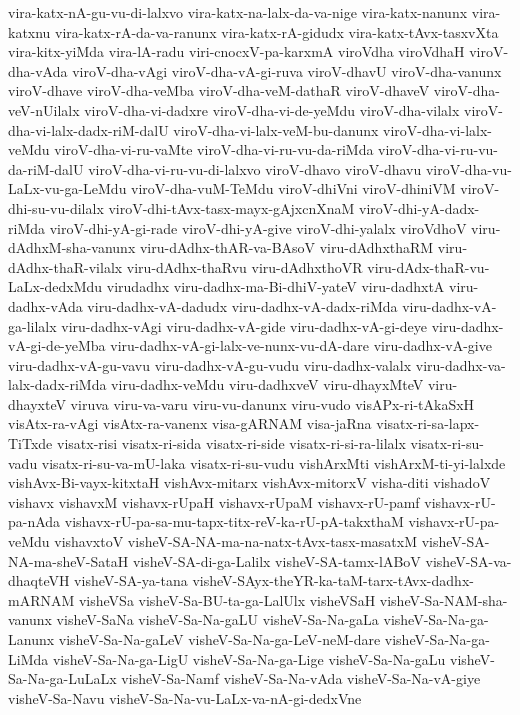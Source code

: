 {vira-katx-nA-gu-vu-di-lalxvo
vira-katx-na-lalx-da-va-nige
vira-katx-nanunx
vira-katxnu
vira-katx-rA-da-va-ranunx
vira-katx-rA-gidudx
vira-katx-tAvx-tasxvXta
vira-kitx-yiMda
vira-lA-radu
viri-cnocxV-pa-karxmA
viroVdha
viroVdhaH
viroV-dha-vAda
viroV-dha-vAgi
viroV-dha-vA-gi-ruva
viroV-dhavU
viroV-dha-vanunx
viroV-dhave
viroV-dha-veMba
viroV-dha-veM-dathaR
viroV-dhaveV
viroV-dha-veV-nUilalx
viroV-dha-vi-dadxre
viroV-dha-vi-de-yeMdu
viroV-dha-vilalx
viroV-dha-vi-lalx-dadx-riM-dalU
viroV-dha-vi-lalx-veM-bu-danunx
viroV-dha-vi-lalx-veMdu
viroV-dha-vi-ru-vaMte
viroV-dha-vi-ru-vu-da-riMda
viroV-dha-vi-ru-vu-da-riM-dalU
viroV-dha-vi-ru-vu-di-lalxvo
viroV-dhavo
viroV-dhavu
viroV-dha-vu-LaLx-vu-ga-LeMdu
viroV-dha-vuM-TeMdu
viroV-dhiVni
viroV-dhiniVM
viroV-dhi-su-vu-dilalx
viroV-dhi-tAvx-tasx-mayx-gAjxcnXnaM
viroV-dhi-yA-dadx-riMda
viroV-dhi-yA-gi-rade
viroV-dhi-yA-give
viroV-dhi-yalalx
viroVdhoV
viru-dAdhxM-sha-vanunx
viru-dAdhx-thAR-va-BAsoV
viru-dAdhxthaRM
viru-dAdhx-thaR-vilalx
viru-dAdhx-thaRvu
viru-dAdhxthoVR
viru-dAdx-thaR-vu-LaLx-dedxMdu
virudadhx
viru-dadhx-ma-Bi-dhiV-yateV
viru-dadhxtA
viru-dadhx-vAda
viru-dadhx-vA-dadudx
viru-dadhx-vA-dadx-riMda
viru-dadhx-vA-ga-lilalx
viru-dadhx-vAgi
viru-dadhx-vA-gide
viru-dadhx-vA-gi-deye
viru-dadhx-vA-gi-de-yeMba
viru-dadhx-vA-gi-lalx-ve-nunx-vu-dA-dare
viru-dadhx-vA-give
viru-dadhx-vA-gu-vavu
viru-dadhx-vA-gu-vudu
viru-dadhx-valalx
viru-dadhx-va-lalx-dadx-riMda
viru-dadhx-veMdu
viru-dadhxveV
viru-dhayxMteV
viru-dhayxteV
viruva
viru-va-varu
viru-vu-danunx
viru-vudo
visAPx-ri-tAkaSxH
visAtx-ra-vAgi
visAtx-ra-vanenx
visa-gARNAM
visa-jaRna
visatx-ri-sa-lapx-TiTxde
visatx-risi
visatx-ri-sida
visatx-ri-side
visatx-ri-si-ra-lilalx
visatx-ri-su-vadu
visatx-ri-su-va-mU-laka
visatx-ri-su-vudu
vishArxMti
vishArxM-ti-yi-lalxde
vishAvx-Bi-vayx-kitxtaH
vishAvx-mitarx
vishAvx-mitorxV
visha-diti
vishadoV
vishavx
vishavxM
vishavx-rUpaH
vishavx-rUpaM
vishavx-rU-pamf
vishavx-rU-pa-nAda
vishavx-rU-pa-sa-mu-tapx-titx-reV-ka-rU-pA-takxthaM
vishavx-rU-pa-veMdu
vishavxtoV
visheV-SA-NA-ma-na-natx-tAvx-tasx-masatxM
visheV-SA-NA-ma-sheV-SataH
visheV-SA-di-ga-Lalilx
visheV-SA-tamx-lABoV
visheV-SA-va-dhaqteVH
visheV-SA-ya-tana
visheV-SAyx-theYR-ka-taM-tarx-tAvx-dadhx-mARNAM
visheVSa
visheV-Sa-BU-ta-ga-LalUlx
visheVSaH
visheV-Sa-NAM-sha-vanunx
visheV-SaNa
visheV-Sa-Na-gaLU
visheV-Sa-Na-gaLa
visheV-Sa-Na-ga-Lanunx
visheV-Sa-Na-gaLeV
visheV-Sa-Na-ga-LeV-neM-dare
visheV-Sa-Na-ga-LiMda
visheV-Sa-Na-ga-LigU
visheV-Sa-Na-ga-Lige
visheV-Sa-Na-gaLu
visheV-Sa-Na-ga-LuLaLx
visheV-Sa-Namf
visheV-Sa-Na-vAda
visheV-Sa-Na-vA-giye
visheV-Sa-Navu
visheV-Sa-Na-vu-LaLx-va-nA-gi-dedxVne
}
